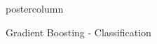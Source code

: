 \documentclass{beamer}
\newlength{\columnheight} %
\begin{document}
\begin{frame}[fragile]{}
\begin{columns}
\begin{column}{.31\textwidth}
\begin{beamercolorbox}[center]{postercolumn}
\begin{minipage}{.98\textwidth}
{\begin{myblock}{Gradient Boosting - Classification}
					\end{myblock}					
				}
			\end{minipage}
		\end{beamercolorbox}
	\end{column}
\end{columns}


\end{frame}

% 
\end{document}
